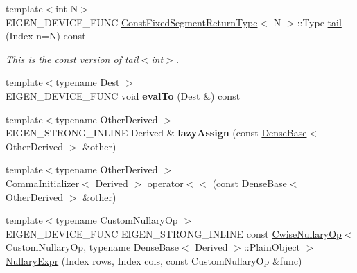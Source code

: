 \begin{DoxyCompactItemize}
\item 
\mbox{\label{class_eigen_1_1_dense_base_a18abf309e26e98ad18aa50035d5d9f2a}} 
{\footnotesize template$<$int N$>$ }\\E\+I\+G\+E\+N\+\_\+\+D\+E\+V\+I\+C\+E\+\_\+\+F\+U\+NC \mbox{\hyperlink{struct_eigen_1_1_dense_base_1_1_const_fixed_segment_return_type}{Const\+Fixed\+Segment\+Return\+Type}}$<$ N $>$\+::Type \mbox{\hyperlink{class_eigen_1_1_dense_base_a18abf309e26e98ad18aa50035d5d9f2a}{tail}} (Index n=N) const
\begin{DoxyCompactList}\small\item\em This is the const version of tail$<$int$>$. \end{DoxyCompactList}\item 
\mbox{\label{class_eigen_1_1_dense_base_ad69e034377b16ee5725826566977d4ed}} 
{\footnotesize template$<$typename Dest $>$ }\\E\+I\+G\+E\+N\+\_\+\+D\+E\+V\+I\+C\+E\+\_\+\+F\+U\+NC void {\bfseries eval\+To} (Dest \&) const
\item 
\mbox{\label{class_eigen_1_1_dense_base_a6a415a4d406deecbc35066f17d9eac8c}} 
{\footnotesize template$<$typename Other\+Derived $>$ }\\E\+I\+G\+E\+N\+\_\+\+S\+T\+R\+O\+N\+G\+\_\+\+I\+N\+L\+I\+NE Derived \& {\bfseries lazy\+Assign} (const \mbox{\hyperlink{class_eigen_1_1_dense_base}{Dense\+Base}}$<$ Other\+Derived $>$ \&other)
\item 
{\footnotesize template$<$typename Other\+Derived $>$ }\\\mbox{\hyperlink{struct_eigen_1_1_comma_initializer}{Comma\+Initializer}}$<$ Derived $>$ \mbox{\hyperlink{class_eigen_1_1_dense_base_a1ba2dba4aac437dc80501e2adfd16103}{operator$<$$<$}} (const \mbox{\hyperlink{class_eigen_1_1_dense_base}{Dense\+Base}}$<$ Other\+Derived $>$ \&other)
\item 
{\footnotesize template$<$typename Custom\+Nullary\+Op $>$ }\\E\+I\+G\+E\+N\+\_\+\+D\+E\+V\+I\+C\+E\+\_\+\+F\+U\+NC E\+I\+G\+E\+N\+\_\+\+S\+T\+R\+O\+N\+G\+\_\+\+I\+N\+L\+I\+NE const \mbox{\hyperlink{class_eigen_1_1_cwise_nullary_op}{Cwise\+Nullary\+Op}}$<$ Custom\+Nullary\+Op, typename \mbox{\hyperlink{class_eigen_1_1_dense_base}{Dense\+Base}}$<$ Derived $>$\+::\mbox{\hyperlink{class_eigen_1_1_dense_base_aae45af9b5aca5a9caae98fd201f47cc4}{Plain\+Object}} $>$ \mbox{\hyperlink{class_eigen_1_1_dense_base_a3ea498fabfd5b313a643705813ee9ce5}{Nullary\+Expr}} (Index rows, Index cols, const Custom\+Nullary\+Op \&func)

\end{DoxyCompactItemize}
